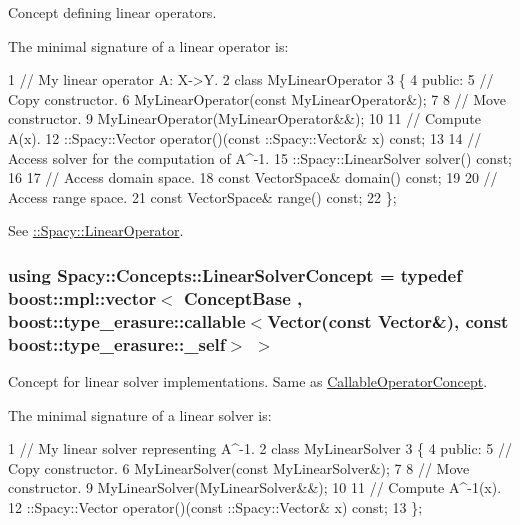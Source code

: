 Concept defining linear operators. 

\label{group__ConceptGroup_gaf0e18e41c434cfceb77ccb8e785a8055_LinearOperatorConceptAnchor}%
\hypertarget{group__ConceptGroup_gaf0e18e41c434cfceb77ccb8e785a8055_LinearOperatorConceptAnchor}{}%
The minimal signature of a linear operator is\+: 
\begin{DoxyCode}
1 // My linear operator A: X->Y.
2 class MyLinearOperator
3 \{
4 public:
5   // Copy constructor.
6   MyLinearOperator(const MyLinearOperator&);
7 
8   // Move constructor.
9   MyLinearOperator(MyLinearOperator&&);
10 
11   // Compute A(x).
12   ::Spacy::Vector operator()(const ::Spacy::Vector& x) const;
13 
14   // Access solver for the computation of A^-1.
15   ::Spacy::LinearSolver solver() const;
16 
17   // Access domain space.
18   const VectorSpace& domain() const;
19 
20   // Access range space.
21   const VectorSpace& range() const;
22 \};
\end{DoxyCode}


See \hyperlink{group__SpacyGroup_ga584f7b9d82a844302ba0d77c3a1b6640_LinearOperatorAnchor}{\+:\+:Spacy\+:\+:Linear\+Operator}. \hypertarget{group__ConceptGroup_gac7d6a94c7131c8613e2ab26fddeb50bd_gac7d6a94c7131c8613e2ab26fddeb50bd}{}
\subsubsection[{Linear\+Solver\+Concept}]{\setlength{\rightskip}{0pt plus 5cm}using {\bf Spacy\+::\+Concepts\+::\+Linear\+Solver\+Concept} = typedef boost\+::mpl\+::vector$<$ {\bf Concept\+Base} , boost\+::type\+\_\+erasure\+::callable$<${\bf Vector}(const {\bf Vector}\&), const boost\+::type\+\_\+erasure\+::\+\_\+self$>$ $>$}\label{group__ConceptGroup_gac7d6a94c7131c8613e2ab26fddeb50bd_gac7d6a94c7131c8613e2ab26fddeb50bd}


Concept for linear solver implementations. Same as \hyperlink{group__ConceptGroup_gadec0c664abaacc2065dadd8b11cc8d30_CallableOperatorConceptAnchor}{Callable\+Operator\+Concept}. 

\label{group__ConceptGroup_gac7d6a94c7131c8613e2ab26fddeb50bd_LinearSolverConceptAnchor}%
\hypertarget{group__ConceptGroup_gac7d6a94c7131c8613e2ab26fddeb50bd_LinearSolverConceptAnchor}{}%
The minimal signature of a linear solver is\+: 
\begin{DoxyCode}
1 // My linear solver representing A^-1.
2 class MyLinearSolver
3 \{
4 public:
5   // Copy constructor.
6   MyLinearSolver(const MyLinearSolver&);
7 
8   // Move constructor.
9   MyLinearSolver(MyLinearSolver&&);
10 
11   // Compute A^-1(x).
12   ::Spacy::Vector operator()(const ::Spacy::Vector& x) const;
13 \};
\end{DoxyCode}


